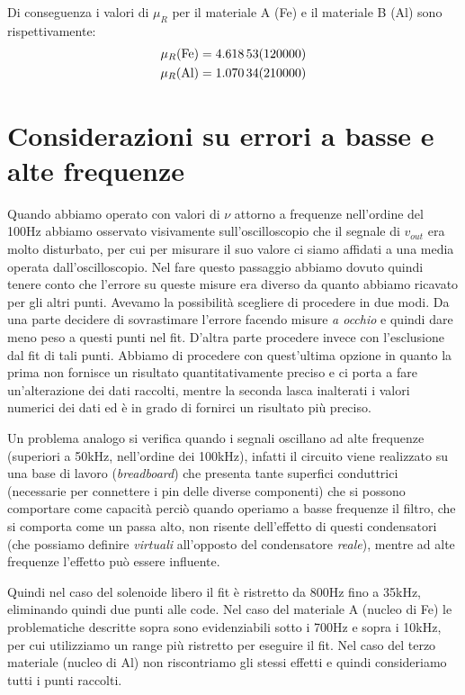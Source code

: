 \documentclass[
    prl,
    floatfix,
    reprint, 
    superscriptaddress, 
    altaffilletter, 
    amsmath, 
    amssymb, 
    a4paper]{revtex4-2}
\begin{document}
Di conseguenza i valori di $\mu_R$ per il materiale A (Fe) e il materiale B (Al) sono rispettivamente:
\begin{align*}
  \mu_R(\text{Fe}) &= \num{4.61853 +- 1.2}\\
  \mu_R(\text{Al}) &= \num{1.07034 +- 2.1}\\  
\end{align*}


\section*{Considerazioni su errori a basse e alte frequenze}
Quando abbiamo operato con valori di $\nu$ attorno a frequenze nell'ordine del 100Hz abbiamo osservato visivamente sull'oscilloscopio che il segnale di $v_{out}$ era molto disturbato, per cui per misurare il suo valore ci siamo affidati a una media operata dall'oscilloscopio. Nel fare questo passaggio abbiamo dovuto quindi tenere conto che l'errore su queste misure era diverso da quanto abbiamo ricavato per gli altri punti. Avevamo la possibilità scegliere di procedere in due modi. Da una parte  decidere di sovrastimare l'errore facendo misure \textit{a occhio} e quindi dare meno peso a questi punti nel fit. D'altra parte procedere invece con l'esclusione dal fit di tali punti. Abbiamo di procedere con quest'ultima opzione in quanto la prima non fornisce un risultato quantitativamente preciso e ci porta a fare un'alterazione dei dati raccolti, mentre la seconda lasca inalterati i valori numerici dei dati ed è in grado di fornirci un risultato più preciso. 

Un problema analogo si verifica quando i segnali oscillano ad alte frequenze (superiori a 50kHz, nell'ordine dei 100kHz), infatti il circuito viene realizzato su una base di lavoro (\textit{breadboard}) che presenta tante superfici conduttrici (necessarie per connettere i pin delle diverse componenti) che si possono comportare come capacità perciò quando operiamo a basse frequenze il filtro, che si comporta come un passa alto, non risente dell'effetto di questi condensatori (che possiamo definire \textit{virtuali} all'opposto del condensatore \textit{reale}), mentre ad alte frequenze l'effetto può essere influente. 

Quindi nel caso del solenoide libero il fit è ristretto da 800Hz fino a 35kHz, eliminando quindi due punti alle code. Nel caso del materiale A (nucleo di Fe) le problematiche descritte sopra sono evidenziabili sotto i 700Hz e sopra i 10kHz, per cui utilizziamo un range più ristretto per eseguire il fit. Nel caso del terzo materiale (nucleo di Al) non riscontriamo gli stessi effetti e quindi consideriamo tutti i punti raccolti. 
\end{document}
